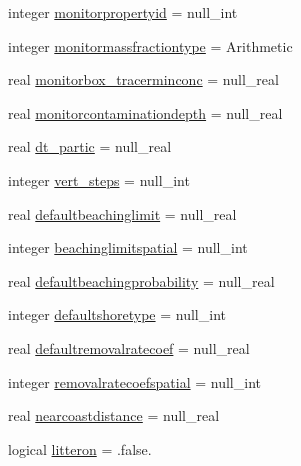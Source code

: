 \begin{DoxyCompactItemize}
\item 
integer \mbox{\hyperlink{structmodulelagrangianglobal_1_1t__lagrangian_a23b547437dcd8a277850b84f8bbcb581}{monitorpropertyid}} = null\+\_\+int
\item 
integer \mbox{\hyperlink{structmodulelagrangianglobal_1_1t__lagrangian_a95710bd8f3d6738db425bfe44b80f22e}{monitormassfractiontype}} = Arithmetic
\item 
real \mbox{\hyperlink{structmodulelagrangianglobal_1_1t__lagrangian_aec0f135caa20270c9126e7f4349125f9}{monitorbox\+\_\+tracerminconc}} = null\+\_\+real
\item 
real \mbox{\hyperlink{structmodulelagrangianglobal_1_1t__lagrangian_aa9e0784b3803679210c337bd0617f86d}{monitorcontaminationdepth}} = null\+\_\+real
\item 
real \mbox{\hyperlink{structmodulelagrangianglobal_1_1t__lagrangian_afc0ae0b383cee01d787c3937709351a3}{dt\+\_\+partic}} = null\+\_\+real
\item 
integer \mbox{\hyperlink{structmodulelagrangianglobal_1_1t__lagrangian_adb50ba34b648bf6738905d8f965a49d4}{vert\+\_\+steps}} = null\+\_\+int
\item 
real \mbox{\hyperlink{structmodulelagrangianglobal_1_1t__lagrangian_ae12777bcd12ade11c03c2304f439adab}{defaultbeachinglimit}} = null\+\_\+real
\item 
integer \mbox{\hyperlink{structmodulelagrangianglobal_1_1t__lagrangian_a4dcece5496eaf4f4fb58ed63250f9bca}{beachinglimitspatial}} = null\+\_\+int
\item 
real \mbox{\hyperlink{structmodulelagrangianglobal_1_1t__lagrangian_a8562c6f5a37510bb9459c2a862a4f503}{defaultbeachingprobability}} = null\+\_\+real
\item 
integer \mbox{\hyperlink{structmodulelagrangianglobal_1_1t__lagrangian_a4c74193c1f1f1800fe5bad2ac1bba3e2}{defaultshoretype}} = null\+\_\+int
\item 
real \mbox{\hyperlink{structmodulelagrangianglobal_1_1t__lagrangian_a4a4e535f9efe40133e5c26d12abe09e9}{defaultremovalratecoef}} = null\+\_\+real
\item 
integer \mbox{\hyperlink{structmodulelagrangianglobal_1_1t__lagrangian_a43049196b64b6bb782f94f304fee4f6f}{removalratecoefspatial}} = null\+\_\+int
\item 
real \mbox{\hyperlink{structmodulelagrangianglobal_1_1t__lagrangian_a76d2c2ef359bb787ef062f1752c0fb5d}{nearcoastdistance}} = null\+\_\+real
\item 
logical \mbox{\hyperlink{structmodulelagrangianglobal_1_1t__lagrangian_ad0fa9d07476746d1b546b8dd2e356047}{litteron}} = .false.

\end{DoxyCompactItemize}
